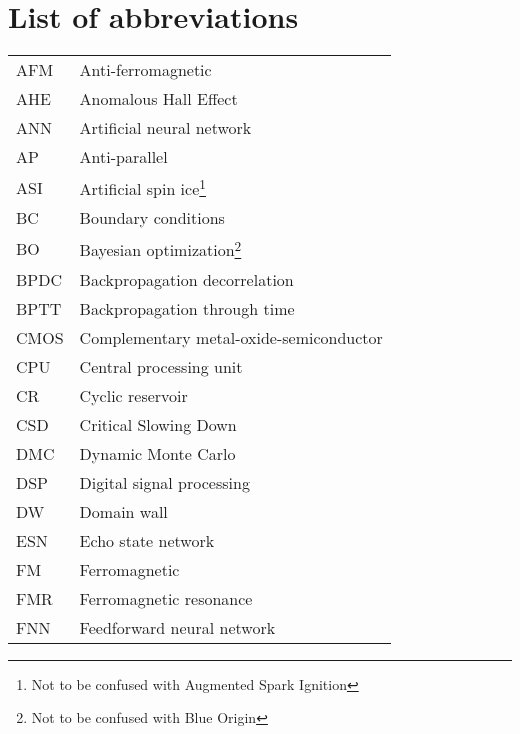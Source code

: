 \chapter{List of abbreviations}
{
    \addtolength{\skip\footins}{1pc}
    \begin{longtable}[l]{ll}
        AFM   & Anti-ferromagnetic                          \\
        AHE   & Anomalous Hall Effect                       \\
        ANN   & Artificial neural network                   \\
        AP    & Anti-parallel                               \\
        ASI   & Artificial spin ice\footnote{Not to be confused with Augmented Spark Ignition} \\
        BC    & Boundary conditions                         \\
        BO    & Bayesian optimization\footnote{Not to be confused with Blue Origin} \\
        BPDC  & Backpropagation decorrelation               \\
        BPTT  & Backpropagation through time                \\
        CMOS  & Complementary metal-oxide-semiconductor     \\
        CPU   & Central processing unit                     \\
        CR    & Cyclic reservoir                            \\
        CSD   & Critical Slowing Down                       \\
        DMC   & Dynamic Monte Carlo                         \\
        DSP   & Digital signal processing                   \\
        DW    & Domain wall                                 \\
        ESN   & Echo state network                          \\
        FM    & Ferromagnetic                               \\
        FMR   & Ferromagnetic resonance                     \\ %
        FNN   & Feedforward neural network                  \\

\end{longtable}}
